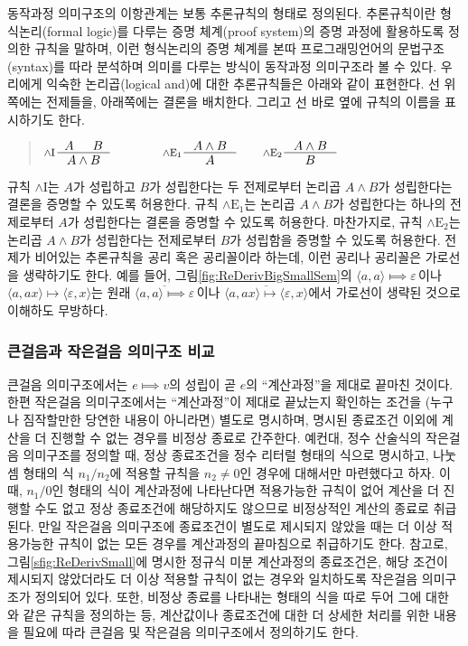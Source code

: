 동작과정 의미구조의 이항관계는 보통 추론규칙의 형태로 정의된다.
추론규칙이란 형식논리(formal logic)를 다루는 증명 체계(proof system)의
증명 과정에 활용하도록 정의한 규칙을 말하며, 이런 형식논리의 증명 쳬계를
본따 프로그래밍언어의 문법구조(syntax)를 따라 분석하며 의미를 다루는 방식이
동작과정 의미구조라 볼 수 있다. 우리에게 익숙한 논리곱(logical and)에 대한
추론규칙들은 아래와 같이 표현한다. 선 위쪽에는 전제들을, 아래쪽에는
결론을 배치한다. 그리고 선 바로 옆에 규칙의 이름을 표시하기도 한다.
\begin{quote}
\( \inference*[$\land\mathrm{I}$]{A & B}{A \land B}\qquad\qquad
   \inference[$\land\mathrm{E}_1$]{A\land B}{A} \qquad
   \inference[$\land\mathrm{E}_2$]{A\land B}{B} \)
\end{quote}
규칙 $\land\mathrm{I}$는 $A$가 성립하고 $B$가 성립한다는 두 전제로부터
논리곱 $A\land B$가 성립한다는 결론을 증명할 수 있도록 허용한다.
규칙 $\land\mathrm{E}_1$는 논리곱 $A\land B$가 성립한다는 하나의 전제로부터
$A$가 성립한다는 결론을 증명할 수 있도록 허용한다. 마찬가지로,
규칙 $\land\mathrm{E}_2$는 논리곱 $A\land B$가 성립한다는 전제로부터
$B$가 성립함을 증명할 수 있도록 허용한다. 전제가 비어있는 추론규칙을
공리 혹은 공리꼴이라 하는데, 이런 공리나 공리꼴은 가로선을 생략하기도 한다.
예를 들어, 그림\;\ref{fig:ReDerivBigSmallSem}의
$\langle a, a\rangle\!\Longmapsto\!\varepsilon\,$이나
$\langle a, ax\rangle\!\longmapsto\!\langle\varepsilon, x\rangle$는
원래
$\overline{
  \langle a, a\rangle\!\Longmapsto\!\varepsilon}\,$이나
$\overline{
  \langle a, ax\rangle\!\longmapsto\!\langle\varepsilon, x\rangle}$에서
가로선이 생략된 것으로 이해하도 무방하다.

\subsubsection{큰걸음과 작은걸음 의미구조 비교}
큰걸음 의미구조에서는 $e\Longmapsto v$의 성립이 곧 $e$의 ``계산과정''을
제대로 끝마친 것이다. 한편 작은걸음 의미구조에서는 ``계산과정''이 제대로
끝났는지 확인하는 조건을 (누구나 짐작할만한 당연한 내용이 아니라면) 별도로
명시하며, 명시된 종료조건 이외에 계산을 더 진행할 수 없는 경우를 비정상
종료로 간주한다. 예컨대, 정수 산술식의 작은걸음 의미구조를 정의할 때,
정상 종료조건을 정수 리터럴 형태의 식으로 명시하고, 나눗셈 형태의 식
$n_1 / n_2$에 적용할 규칙을 $n_2\neq 0$인 경우에 대해서만 마련했다고 하자.
이 때, $n_1/0$인 형태의 식이 계산과정에 나타난다면 적용가능한 규칙이 없어
계산을 더 진행할 수도 없고 정상 종료조건에 해당하지도 않으므로 비정상적인
계산의 종료로 취급된다. 만일 작은걸음 의미구조에 종료조건이 별도로 제시되지
않았을 때는 더 이상 적용가능한 규칙이 없는 모든 경우를 계산과정의
끝마침으로 취급하기도 한다. 참고로, 그림\;\ref{sfig:ReDerivSmall}에 명시한
정규식 미분 계산과정의 종료조건은, 해당 조건이 제시되지 않았더라도 더 이상
적용할 규칙이 없는 경우와 일치하도록 작은걸음 의미구조가 정의되어 있다.
또한, 비정상 종료를 나타내는 형태의 식을 따로 두어 그에 대한 와 같은
규칙을 정의하는 등, 계산값이나 종료조건에 대한 더 상세한 처리를 위한
내용을 필요에 따라 큰걸음 및 작은걸음 의미구조에서 정의하기도 한다.

